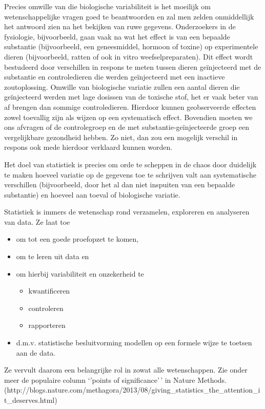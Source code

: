 \documentclass[
  dutch,
  letterpaper,
  12pt]{book}
\providecommand{\tightlist}{%
  \setlength{\itemsep}{0pt}\setlength{\parskip}{0pt}}
\theoremstyle{definition}
\theoremstyle{definition}
\theoremstyle{definition}
\theoremstyle{remark}
\begin{document}
Precies omwille van die biologische variabiliteit is het moeilijk om
wetenschappelijke vragen goed te beantwoorden en zal men zelden
onmiddellijk het antwoord zien na het bekijken van ruwe gegevens.
Onderzoekers in de fysiologie, bijvoorbeeld, gaan vaak na wat het effect
is van een bepaalde substantie (bijvoorbeeld, een geneesmiddel, hormoon
of toxine) op experimentele dieren (bijvoorbeeld, ratten of ook in vitro
weefselpreparaten). Dit effect wordt bestudeerd door verschillen in
respons te meten tussen dieren geïnjecteerd met de substantie en
controledieren die werden geïnjecteerd met een inactieve zoutoplossing.
Omwille van biologische variatie zullen een aantal dieren die
geïnjecteerd werden met lage dosissen van de toxische stof, het er vaak
beter van af brengen dan sommige controledieren. Hierdoor kunnen
geobserveerde effecten zowel toevallig zijn als wijzen op een
systematisch effect. Bovendien moeten we ons afvragen of de
controlegroep en de met substantie-geïnjecteerde groep een vergelijkbare
gezondheid hebben. Zo niet, dan zou een mogelijk verschil in respons ook
mede hierdoor verklaard kunnen worden.

Het doel van statistiek is precies om orde te scheppen in de chaos door
duidelijk te maken hoeveel variatie op de gegevens toe te schrijven valt
aan systematische verschillen (bijvoorbeeld, door het al dan niet
inspuiten van een bepaalde substantie) en hoeveel aan toeval of
biologische variatie.

Statistiek is immers de wetenschap rond verzamelen, exploreren en
analyseren van data. Ze laat toe

\begin{itemize}
\tightlist
\item
  om tot een goede proefopzet te komen,
\item
  om te leren uit data en
\item
  om hierbij variabiliteit en onzekerheid te

  \begin{itemize}
  \tightlist
  \item
    kwantificeren
  \item
    controleren
  \item
    rapporteren
  \end{itemize}
\item
  d.m.v. statistische besluitvorming modellen op een formele wijze te
  toetsen aan de data.
\end{itemize}

Ze vervult daarom een belangrijke rol in zowat alle wetenschappen. Zie
onder meer de populaire column `'points of significance'\,' in Nature
Methods.
(http://blogs.nature.com/methagora/2013/08/giving\_statistics\_the\_attention\_it\_deserves.html)
\end{document}
